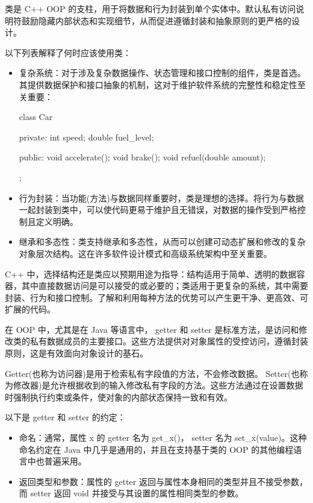 
类是 C++ OOP 的支柱，用于将数据和行为封装到单个实体中。默认私有访问说明符鼓励隐藏内部状态和实现细节，从而促进遵循封装和抽象原则的更严格的设计。

以下列表解释了何时应该使用类：

\begin{itemize}
\item
复杂系统：对于涉及复杂数据操作、状态管理和接口控制的组件，类是首选。其提供数据保护和接口抽象的机制，这对于维护软件系统的完整性和稳定性至关重要：

\begin{cpp}
class Car {
private:
    int speed;
    double fuel_level;

public:
    void accelerate();
    void brake();
    void refuel(double amount);
};
\end{cpp}

\item
行为封装：当功能(方法)与数据同样重要时，类是理想的选择。将行为与数据一起封装到类中，可以使代码更易于维护且无错误，对数据的操作受到严格控制且定义明确。

\item
继承和多态性：类支持继承和多态性，从而可以创建可动态扩展和修改的复杂对象层次结构。这在许多软件设计模式和高级系统架构中至关重要。
\end{itemize}

C++ 中，选择结构还是类应以预期用途为指导：结构适用于简单、透明的数据容器，其中直接数据访问是可以接受的或必要的；类适用于更复杂的系统，其中需要封装、行为和接口控制。了解和利用每种方法的优势可以产生更干净、更高效、可扩展的代码。


在 OOP 中，尤其是在 Java 等语言中， getter 和 setter 是标准方法，是访问和修改类的私有数据成员的主要接口。这些方法提供对对象属性的受控访问，遵循封装原则，这是有效面向对象设计的基石。


Getter(也称为访问器)是用于检索私有字段值的方法，不会修改数据。 Setter(也称为修改器)是允许根据收到的输入修改私有字段的方法。这些方法通过在设置数据时强制执行约束或条件，使对象的内部状态保持一致和有效。

以下是 getter 和 setter 的约定：

\begin{itemize}
\item
命名：通常，属性 x 的 getter 名为 get\_x()， setter 名为 set\_x(value)。这种命名约定在 Java 中几乎是通用的，并且在支持基于类的 OOP 的其他编程语言中也普遍采用。

\item
返回类型和参数：属性的 getter 返回与属性本身相同的类型并且不接受参数，而 setter 返回 void 并接受与其设置的属性相同类型的参数。
\end{itemize}

